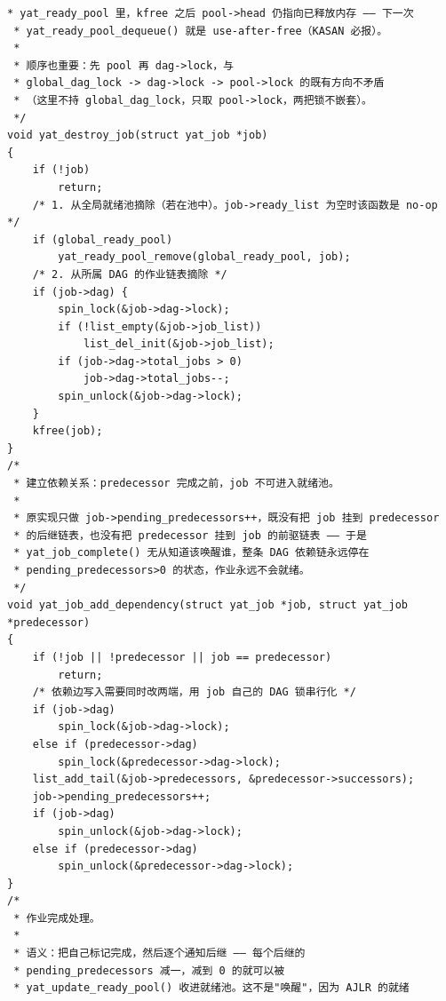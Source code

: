 \documentclass[10pt,a4paper]{article}
\newenvironment{yatpage}{\vspace*{0pt}}{\par}
\begin{document}
\begin{yatpage}
\begin{Verbatim}[fontsize=\fontsize{8.2}{9.8}\selectfont]
 * yat_ready_pool 里，kfree 之后 pool->head 仍指向已释放内存 —— 下一次
 * yat_ready_pool_dequeue() 就是 use-after-free（KASAN 必报）。
 *
 * 顺序也重要：先 pool 再 dag->lock，与
 * global_dag_lock -> dag->lock -> pool->lock 的既有方向不矛盾
 * （这里不持 global_dag_lock，只取 pool->lock，两把锁不嵌套）。
 */
void yat_destroy_job(struct yat_job *job)
{
    if (!job)
        return;
    /* 1. 从全局就绪池摘除（若在池中）。job->ready_list 为空时该函数是 no-op */
    if (global_ready_pool)
        yat_ready_pool_remove(global_ready_pool, job);
    /* 2. 从所属 DAG 的作业链表摘除 */
    if (job->dag) {
        spin_lock(&job->dag->lock);
        if (!list_empty(&job->job_list))
            list_del_init(&job->job_list);
        if (job->dag->total_jobs > 0)
            job->dag->total_jobs--;
        spin_unlock(&job->dag->lock);
    }
    kfree(job);
}
/*
 * 建立依赖关系：predecessor 完成之前，job 不可进入就绪池。
 *
 * 原实现只做 job->pending_predecessors++，既没有把 job 挂到 predecessor
 * 的后继链表，也没有把 predecessor 挂到 job 的前驱链表 —— 于是
 * yat_job_complete() 无从知道该唤醒谁，整条 DAG 依赖链永远停在
 * pending_predecessors>0 的状态，作业永远不会就绪。
 */
void yat_job_add_dependency(struct yat_job *job, struct yat_job *predecessor)
{
    if (!job || !predecessor || job == predecessor)
        return;
    /* 依赖边写入需要同时改两端，用 job 自己的 DAG 锁串行化 */
    if (job->dag)
        spin_lock(&job->dag->lock);
    else if (predecessor->dag)
        spin_lock(&predecessor->dag->lock);
    list_add_tail(&job->predecessors, &predecessor->successors);
    job->pending_predecessors++;
    if (job->dag)
        spin_unlock(&job->dag->lock);
    else if (predecessor->dag)
        spin_unlock(&predecessor->dag->lock);
}
/*
 * 作业完成处理。
 *
 * 语义：把自己标记完成，然后逐个通知后继 —— 每个后继的
 * pending_predecessors 减一，减到 0 的就可以被
 * yat_update_ready_pool() 收进就绪池。这不是"唤醒"，因为 AJLR 的就绪
\end{Verbatim}
\end{yatpage}
\newpage
\end{document}
